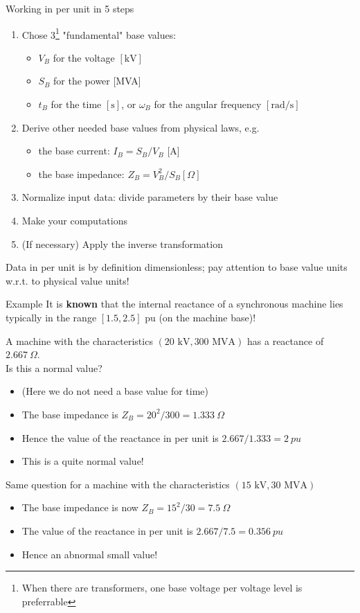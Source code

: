\begin{frame}{Working in per unit in 5 steps}
\begin{enumerate}
    \item Chose 3\footnote{When there are transformers, one base voltage per voltage level is preferrable} "fundamental" base values:
    \begin{itemize}
        \item $V_B$ for the voltage $[\mathrm{kV}]$
        \item $S_B$ for the power [MVA]
        \item $t_B$ for the time $[\mathrm{s}]$, or $\omega_B$ for the angular frequency $[\mathrm{rad} / \mathrm{s}]$
    \end{itemize}
    \item Derive other needed base values from physical laws, e.g.
    \begin{itemize}
        \item the base current: $I_B=S_B / V_B$ [A]
        \item the base impedance: $Z_B=V_B^2 / S_B[\Omega]$
    \end{itemize}
    \item Normalize input data: divide parameters by their base value
    \item Make your computations
    \item (If necessary) Apply the inverse transformation
\end{enumerate}

Data in per unit is by definition dimensionless; pay attention to base value units w.r.t. to physical value units!
\end{frame}

\begin{frame}[allowframebreaks]{Example}
    It is \textbf{known} that the internal reactance of a synchronous machine lies typically in the range $[1.5, 2.5] \text{ pu}$ (on the machine base)! 
     
    A machine with the characteristics $(20 \text{ kV}, 300 \text{ MVA})$ has a reactance of $2.667 \ \Omega$.\\ Is this a normal value?
    \begin{itemize}
        \item (Here we do not need a base value for time)
        \item The base impedance is $Z_B = 20^2/300 = 1.333 \ \Omega$
        \item Hence the value of the reactance in per unit is $2.667/1.333 = 2 \ pu$
        \item This is a quite normal value!
    \end{itemize}
    Same question for a machine with the characteristics $(15 \text{ kV}, 30 \text{ MVA})$
    \begin{itemize}
        \item The base impedance is now $Z_B=15^2/30 = 7.5 \ \Omega$
        \item The value of the reactance in per unit is $2.667/7.5 = 0.356 \ pu$
        \item Hence an abnormal small value!
    \end{itemize}
\end{frame}

